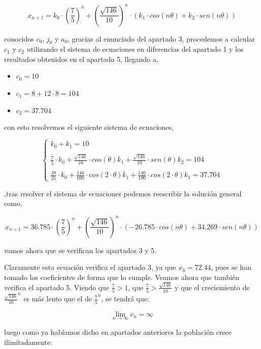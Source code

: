 \documentclass{article}
\begin{document}
\begin{equation*}
x_{n+1} = k_0\cdot(\frac{7}{5})^n + (\frac{\sqrt{146}}{10})^n\cdot(k_1\cdot cos(n\theta) + k_2\cdot sen(n\theta))
\end{equation*}

conocidos $c_0$, $j_0$ y $a_0$, gracias al enunciado del apartado 3, procedemos a calcular $c_1$ y $c_2$ utilizando el sistema de ecuaciones en diferencias del apartado 1 y los resultados obtenidos en el apartado 5, llegando a,

\begin{itemize}
\item $c_0 = 10$
\item $c_1 = 8 + 12\cdot8=104$
\item $c_2 = 37.704$
\end{itemize}

con esto resolvemos el siguiente sistema de ecuaciones,

\begin{equation*}
\left\{ \begin{array}{lcc}
             k_0 + k_1 = 10 \\
             \\ \frac{7}{5}\cdot k_0 + \frac{\sqrt{146}}{10}\cdot cos(\theta) k_1 + \frac{\sqrt{146}}{10}\cdot sen(\theta) k_2 = 104 \\
             \\ \frac{49}{25} \cdot k_0 + \frac{146}{100}\cdot cos(2\cdot \theta) k_1 + \frac{146}{100}\cdot cos(2\cdot \theta) k_1 = 37.704
             \end{array}
   \right.
\end{equation*}

,tras resolver el sistema de ecuaciones podemos reescribir la solución general como,

\begin{equation*}
x_{n+1} = 36.785\cdot(\frac{7}{5})^n + (\frac{\sqrt{146}}{10})^n\cdot(-26.785 \cdot cos(n\theta)+ 34.269\cdot sen(n\theta))
\end{equation*}

vamos ahora que se verifican los apartados 3 y 5.

Claramente esta ecuación verifica el apartado 3, ya que $x_3 = 72.44$, pues se han tomado los coeficientes de forma que lo cumple. Veamos ahora que también verifica el apartado 5. Viendo que $\frac{7}{5} > 1$, que $\frac{7}{5} > \frac{\sqrt{146}}{10}$ y que el creciemiento de $\frac{\sqrt{146}}{10}^n$ es más lento que el de $\frac{7}{5}^n$, se tendrá que:

\begin{equation*}
\lim_{n \to \infty} c_n = \infty
\end{equation*}

luego como ya habíamos dicho en apartados anteriores la población crece ilimitadamente.
\end{document}
